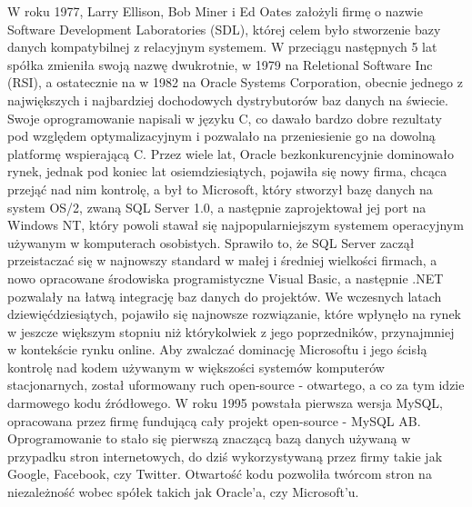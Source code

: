 \documentclass[12pt, a4paper]{article}
\begin{document}
\begin{sloppypar}
{{    W roku 1977, Larry Ellison, Bob Miner i Ed Oates założyli firmę o nazwie Software
    Development Laboratories (SDL), której celem było stworzenie bazy danych kompatybilnej
    z relacyjnym systemem. W przeciągu następnych 5 lat spółka zmieniła swoją nazwę
    dwukrotnie, w 1979 na Reletional Software Inc (RSI), a ostatecznie na w 1982 na
    Oracle Systems Corporation, obecnie jednego z największych i najbardziej dochodowych
    dystrybutorów baz danych na świecie. Swoje oprogramowanie napisali w języku C, co
    dawało bardzo dobre rezultaty pod względem optymalizacyjnym i pozwalało na 
    przeniesienie go na dowolną platformę wspierającą C. Przez wiele lat, Oracle
    bezkonkurencyjnie dominowało rynek, jednak pod koniec lat osiemdziesiątych, pojawiła
    się nowy firma, chcąca przejąć nad nim kontrolę, a był to Microsoft, który stworzył
    bazę danych na system OS/2, zwaną SQL Server 1.0, a następnie zaprojektował jej port
    na Windows NT, który powoli stawał się najpopularniejszym systemem operacyjnym
    używanym w komputerach osobistych. Sprawiło to, że SQL Server zaczął przeistaczać
    się w najnowszy standard w małej i średniej wielkości firmach, a nowo opracowane
    środowiska programistyczne Visual Basic, a następnie .NET pozwalały na łatwą
    integrację baz danych do projektów. We wczesnych latach dziewięćdziesiątych, pojawiło
    się najnowsze rozwiązanie, które wpłynęło na rynek w jeszcze większym stopniu niż
    którykolwiek z jego poprzedników, przynajmniej w kontekście rynku online. Aby zwalczać
    dominację Microsoftu i jego ścisłą kontrolę nad kodem używanym w większości systemów
    komputerów stacjonarnych, został uformowany ruch open-source - otwartego, a co za tym
    idzie darmowego kodu źródłowego. W roku 1995 powstała pierwsza wersja MySQL, opracowana
    przez firmę fundującą cały projekt open-source - MySQL AB. Oprogramowanie to stało
    się pierwszą znaczącą bazą danych używaną w przypadku stron internetowych, do dziś
    wykorzystywaną przez firmy takie jak Google, Facebook, czy Twitter. Otwartość kodu
    pozwoliła twórcom stron na niezależność wobec spółek takich jak Oracle'a, czy Microsoft'u. 

}}
\end{sloppypar}
\end{document}

